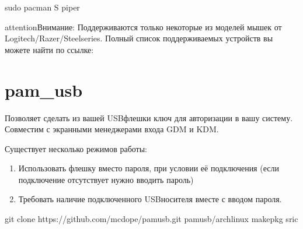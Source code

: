 \documentclass[letterpaper,10pt,russian,openany]{sphinxmanual}
\begin{document}
\sphinxAtStartPar
{}

\begin{sphinxVerbatim}[commandchars=\\\{\}]
sudo pacman \PYGZhy{}S piper
\end{sphinxVerbatim}

\begin{sphinxadmonition}{attention}{Внимание:}
\sphinxAtStartPar
Поддерживаются только некоторые из моделей мышек от Logitech/Razer/Steelseries.
Полный список поддерживаемых устройств вы можете найти по ссылке:

\sphinxAtStartPar
{}
\end{sphinxadmonition}

\ignorespaces 

\section{pam\_usb}
\label{\detokenize{source/useful-programs:pam-usb}}\label{\detokenize{source/useful-programs:index-3}}\label{\detokenize{source/useful-programs:id4}}
\sphinxAtStartPar
Позволяет сделать из вашей USB\sphinxhyphen{}флешки ключ для авторизации в вашу систему.
Совместим с экранными менеджерами входа GDM и KDM.

\sphinxAtStartPar
Существует несколько режимов работы:
\begin{enumerate}
%
\item {} 
\sphinxAtStartPar
Использовать флешку вместо пароля, при условии её подключения (если подключение отсутствует \sphinxhyphen{} нужно вводить пароль)

\item {} 
\sphinxAtStartPar
Требовать наличие подключенного USB\sphinxhyphen{}носителя вместе с вводом пароля.

\end{enumerate}

\sphinxAtStartPar
{}

\begin{sphinxVerbatim}[commandchars=\\\{\}]
git clone https://github.com/mcdope/pam\PYGZus{}usb.git
 pam\PYGZus{}usb/arch\PYGZus{}linux
makepkg \PYGZhy{}sric
\end{sphinxVerbatim}
\end{document}

